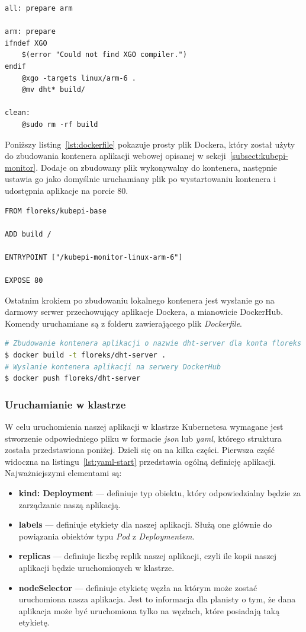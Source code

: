 \documentclass[12pt]{report}
\let\Oldsubsubsection\subsubsection
\renewcommand{\subsubsection}{\FloatBarrier\Oldsubsubsection}
\begin{document}
{\begin{lstlisting}[caption=Makefile użyty do budowania aplikacji dla architektury ARM,label=lst:compiling]
all: prepare arm

arm: prepare
ifndef XGO
	$(error "Could not find XGO compiler.")
endif
	@xgo -targets linux/arm-6 .
	@mv dht* build/

clean:
	@sudo rm -rf build
\end{lstlisting}

\newpage
\noindent Poniższy listing~\ref{lst:dockerfile} pokazuje prosty plik Dockera, który został użyty do zbudowania kontenera aplikacji webowej opisanej w sekcji~\ref{subsect:kubepi-monitor}. Dodaje on zbudowany plik wykonywalny do kontenera, następnie ustawia go jako domyślnie uruchamiany plik po wystartowaniu kontenera i udostępnia aplikacje na porcie 80.
\begin{lstlisting}[caption=Przykładowy plik Dockera dla aplikacji webowej,label=lst:dockerfile]
FROM floreks/kubepi-base

ADD build /

ENTRYPOINT ["/kubepi-monitor-linux-arm-6"]

EXPOSE 80
\end{lstlisting}

\noindent Ostatnim krokiem po zbudowaniu lokalnego kontenera jest wysłanie go na darmowy serwer przechowujący aplikacje Dockera, a mianowicie DockerHub. Komendy uruchamiane są z folderu zawierającego plik \textit{Dockerfile}.
\begin{lstlisting}[language=bash]
# Zbudowanie kontenera aplikacji o nazwie dht-server dla konta floreks
$ docker build -t floreks/dht-server .
# Wyslanie kontenera aplikacji na serwery DockerHub
$ docker push floreks/dht-server
\end{lstlisting}


\newpage
\subsubsection{Uruchamianie w klastrze}
W celu uruchomienia naszej aplikacji w klastrze Kubernetesa wymagane jest stworzenie odpowiedniego pliku w formacie \textit{json} lub \textit{yaml}, którego struktura została przedstawiona poniżej. Dzieli się on na kilka części. Pierwsza część widoczna na listingu~\ref{lst:yaml-start} przedstawia ogólną definicję aplikacji. Najważniejszymi elementami są:
\begin{itemize}
\item{\textbf{kind: Deployment} --- definiuje typ obiektu, który odpowiedzialny będzie za zarządzanie naszą aplikacją.}
\item{\textbf{labels} --- definiuje etykiety dla naszej aplikacji. Służą one głównie do powią\-zania obiektów typu \textit{Pod} z \textit{Deploymentem}.}
\item{\textbf{replicas} --- definiuje liczbę replik naszej aplikacji, czyli ile kopii naszej aplikacji będzie uruchomionych w klastrze.}
\item{\textbf{nodeSelector} --- definiuje etykietę węzła na którym może zostać uruchomiona nasza aplikacja. Jest to informacja dla planisty o tym, że dana aplikacja może być uruchomiona tylko na węzłach, które posiadają taką etykietę.}
\end{itemize}

}
\end{document}
